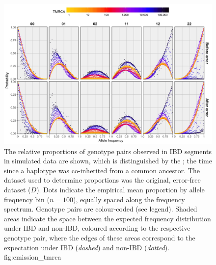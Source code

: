

\begin{figure}[!htb]
\includegraphics[width=\textwidth]{./img/ch4/emission_tmrca_reduced_new}
{The relative proportions of genotype pairs observed in IBD segments in simulated data are shown, which is distinguished by the ; \ie the time since a haplotype was co-inherited from a common ancestor.
The dataset used to determine proportions was the original, error-free dataset ($D$).
Dots indicate the empirical mean proportion by allele frequency bin (${n=100}$), equally spaced along the frequency spectrum.
Genotype pairs are colour-coded (see legend).
Shaded areas indicate the space between the expected frequency distribution under IBD and non-IBD, coloured according to the respective genotype pair, where the edges of these areas correspond to the expectation under IBD (\emph{dashed}) and non-IBD (\emph{dotted}).\CorrectLabel}
{fig:emission_tmrca}
\end{figure}
